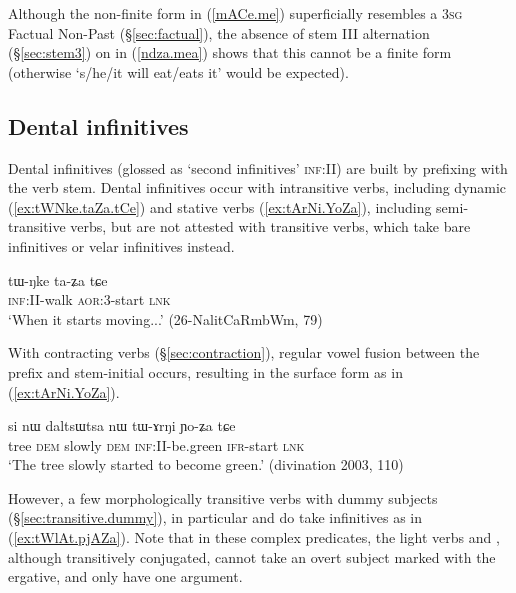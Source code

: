 Although the non-finite form  in  (\ref{mACe.me}) superficially resembles a \textsc{3sg} Factual Non-Past (§\ref{sec:factual}), the absence of stem III alternation (§\ref{sec:stem3}) on  in (\ref{ndza.mea}) shows that this cannot be a finite form (otherwise  `s/he/it will eat/eats it' would be expected).

\subsection{Dental infinitives} \label{sec:dental.inf}
Dental infinitives (glossed as `second infinitives' \textsc{inf}:II) are built by prefixing  with the verb stem. Dental infinitives occur with intransitive verbs, including dynamic (\ref{ex:tWNke.taZa.tCe}) and stative verbs (\ref{ex:tArNi.YoZa}), including semi-transitive verbs, but are not attested with transitive verbs, which take bare infinitives or velar infinitives instead.

\begin{exe} 
\ex \label{ex:tWNke.taZa.tCe}
\gll tɯ-ŋke ta-ʑa tɕe \\
\textsc{inf}:\textsc{II}-walk \textsc{aor}:3\flobv{}-start  \textsc{lnk} \\
\glt `When it starts moving...' (26-NalitCaRmbWm, 79)
\end{exe} 

 
With contracting verbs (§\ref{sec:contraction}), regular vowel fusion between the  prefix and stem-initial   occurs, resulting in the surface form  as in (\ref{ex:tArNi.YoZa}).

\begin{exe} 
\ex \label{ex:tArNi.YoZa}
\gll si nɯ daltsɯtsa nɯ tɯ-ɤrŋi ɲo-ʑa tɕe \\
tree \textsc{dem} slowly \textsc{dem} \textsc{inf}:II-be.green \textsc{ifr}-start \textsc{lnk} \\
\glt `The tree slowly started to become green.' (divination 2003, 110)
\end{exe} 

However, a few morphologically transitive verbs with dummy subjects (§\ref{sec:transitive.dummy}), in particular  and  do take  infinitives as in (\ref{ex:tWlAt.pjAZa}).  Note that in these complex predicates, the light verbs  and , although transitively conjugated, cannot take an overt subject marked with the ergative, and only have one argument.
 
